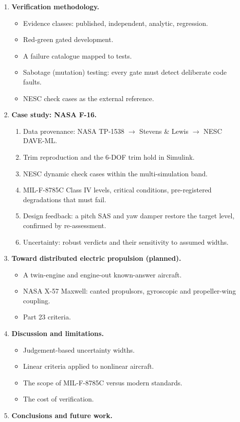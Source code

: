 \documentclass[11pt]{article}
\begin{document}
\begin{enumerate}[label=\arabic*.,leftmargin=*]
\item \textbf{Verification methodology.}
  \begin{itemize}
    \item Evidence classes: published, independent, analytic, regression.
    \item Red-green gated development.
    \item A failure catalogue mapped to tests.
    \item Sabotage (mutation) testing: every gate must detect deliberate
      code faults.
    \item NESC check cases as the external reference.
  \end{itemize}

\item \textbf{Case study: NASA F-16.}
  \begin{enumerate}[label*=\arabic*.]
    \item Data provenance: NASA TP-1538 $\rightarrow$ Stevens \& Lewis
      $\rightarrow$ NESC DAVE-ML.
    \item Trim reproduction and the 6-DOF trim hold in Simulink.
    \item NESC dynamic check cases within the multi-simulation band.
    \item MIL-F-8785C Class IV levels, critical conditions, pre-registered
      degradations that must fail.
    \item Design feedback: a pitch SAS and yaw damper restore the target
      level, confirmed by re-assessment.
    \item Uncertainty: robust verdicts and their sensitivity to assumed
      widths.
  \end{enumerate}

\item \textbf{Toward distributed electric propulsion (planned).}
  \begin{itemize}
    \item A twin-engine and engine-out known-answer aircraft.
    \item NASA X-57 Maxwell: canted propulsors, gyroscopic and propeller-wing
      coupling.
    \item Part 23 criteria.
  \end{itemize}

\item \textbf{Discussion and limitations.}
  \begin{itemize}
    \item Judgement-based uncertainty widths.
    \item Linear criteria applied to nonlinear aircraft.
    \item The scope of MIL-F-8785C versus modern standards.
    \item The cost of verification.
  \end{itemize}

\item \textbf{Conclusions and future work.}
\end{enumerate}
\end{document}
